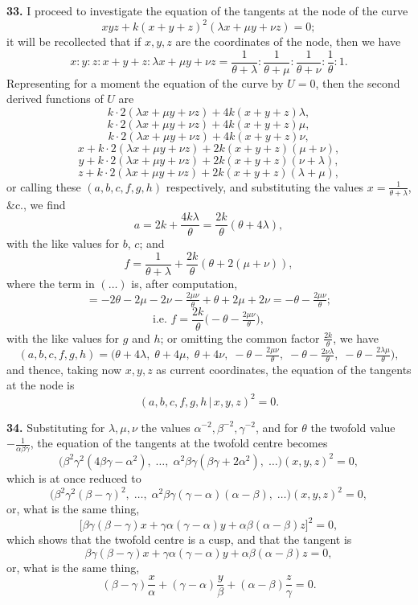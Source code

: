 \documentclass[11pt,a4paper]{article}
\providecommand{\mid}{\,|\,}
\begin{document}
\textbf{33.} I proceed to investigate the equation of the tangents at the node of the curve
\[
xyz + k(x + y + z)^2(\lambda x + \mu y + \nu z) = 0;
\]
it will be recollected that if $x, y, z$ are the coordinates of the node, then we have
\[
x : y : z : x + y + z : \lambda x + \mu y + \nu z = \frac{1}{\theta + \lambda} : \frac{1}{\theta + \mu} : \frac{1}{\theta + \nu} : \frac{1}{\theta} : 1.
\]
Representing for a moment the equation of the curve by $U = 0$, then the second derived functions of $U$ are
\[
k\cdot 2(\lambda x + \mu y + \nu z) + 4k(x + y + z)\lambda,
\]
\[
k\cdot 2(\lambda x + \mu y + \nu z) + 4k(x + y + z)\mu,
\]
\[
k\cdot 2(\lambda x + \mu y + \nu z) + 4k(x + y + z)\nu,
\]
\[
x + k\cdot 2(\lambda x + \mu y + \nu z) + 2k(x + y + z)(\mu + \nu),
\]
\[
y + k\cdot 2(\lambda x + \mu y + \nu z) + 2k(x + y + z)(\nu + \lambda),
\]
\[
z + k\cdot 2(\lambda x + \mu y + \nu z) + 2k(x + y + z)(\lambda + \mu),
\]
or calling these $(a, b, c, f, g, h)$ respectively, and substituting the values $x = \tfrac{1}{\theta + \lambda}$, \&c., we find
\[
a = 2k + \frac{4k\lambda}{\theta} = \frac{2k}{\theta}(\theta + 4\lambda),
\]
with the like values for $b$, $c$; and
\[
f = \frac{1}{\theta + \lambda} + \frac{2k}{\theta}(\theta + 2(\mu + \nu)),
\]
where the term in $(\ldots)$ is, after computation,
\[
= -2\theta - 2\mu - 2\nu - \tfrac{2\mu\nu}{\theta} + \theta + 2\mu + 2\nu = -\theta - \tfrac{2\mu\nu}{\theta};
\]
\[
\text{i.e. } f = \frac{2k}{\theta}\bigl(-\theta - \tfrac{2\mu\nu}{\theta}\bigr),
\]
with the like values for $g$ and $h$; or omitting the common factor $\tfrac{2k}{\theta}$, we have
\[
(a, b, c, f, g, h) = \bigl(\theta + 4\lambda,\;\theta + 4\mu,\;\theta + 4\nu,\;-\theta - \tfrac{2\mu\nu}{\theta},\;-\theta - \tfrac{2\nu\lambda}{\theta},\;-\theta - \tfrac{2\lambda\mu}{\theta}\bigr),
\]
and thence, taking now $x, y, z$ as current coordinates, the equation of the tangents at the node is
\[
(a, b, c, f, g, h \mid x, y, z)^2 = 0.
\]

\medskip

\textbf{34.} Substituting for $\lambda, \mu, \nu$ the values $\alpha^{-2}, \beta^{-2}, \gamma^{-2}$, and for $\theta$ the twofold value $-\tfrac{1}{\alpha\beta\gamma}$, the equation of the tangents at the twofold centre becomes
\[
\bigl(\beta^2\gamma^2(4\beta\gamma - \alpha^2),\;\ldots,\;\alpha^2\beta\gamma(\beta\gamma + 2\alpha^2),\;\ldots\bigr)(x, y, z)^2 = 0,
\]
which is at once reduced to
\[
\bigl(\beta^2\gamma^2(\beta - \gamma)^2,\;\ldots,\;\alpha^2\beta\gamma(\gamma - \alpha)(\alpha - \beta),\;\ldots\bigr)(x, y, z)^2 = 0,
\]
or, what is the same thing,
\[
\bigl[\beta\gamma(\beta - \gamma)x + \gamma\alpha(\gamma - \alpha)y + \alpha\beta(\alpha - \beta)z\bigr]^2 = 0,
\]
which shows that the twofold centre is a cusp, and that the tangent is
\[
\beta\gamma(\beta - \gamma)x + \gamma\alpha(\gamma - \alpha)y + \alpha\beta(\alpha - \beta)z = 0,
\]
or, what is the same thing,
\[
(\beta - \gamma)\frac{x}{\alpha} + (\gamma - \alpha)\frac{y}{\beta} + (\alpha - \beta)\frac{z}{\gamma} = 0.
\]
\end{document}
